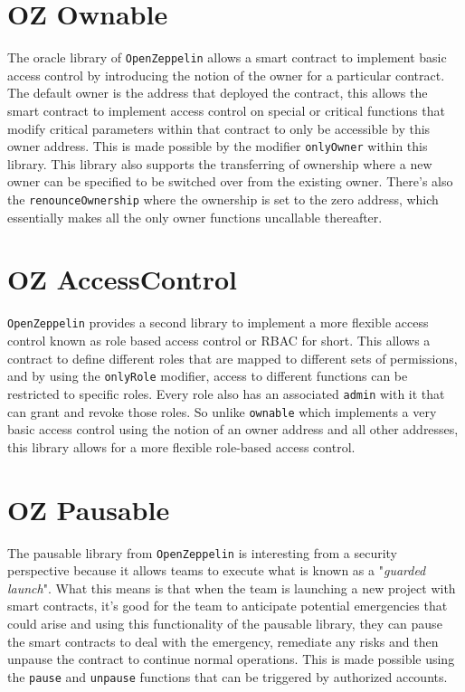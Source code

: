 \section{OZ Ownable}
The oracle library of \verb|OpenZeppelin| allows a smart contract to implement basic access control by introducing the notion of the owner for a particular contract. The default owner is the address that deployed the contract, this allows the smart contract to implement access control on special or critical functions that modify critical parameters within that contract to only be accessible by this owner address. This is made possible by the modifier \verb|onlyOwner| within this library. This library also supports the transferring of ownership where a new owner can be specified to be switched over from the existing owner. There's also the \verb|renounceOwnership| where the ownership is set to the zero address, which essentially makes all the only owner functions uncallable thereafter.

\section{OZ AccessControl}
\verb|OpenZeppelin| provides a second library to implement a more flexible access control known as role based access control or RBAC for short. This allows a contract to define different roles that are mapped to different sets of permissions, and by using the \verb|onlyRole| modifier, access to different functions can be restricted to specific roles. Every role also has an associated \verb|admin| with it that can grant and revoke those roles. So unlike \verb|ownable| which implements a very basic access control using the notion of an owner address and all other addresses, this library allows for a more flexible role-based access control.

\section{OZ Pausable}
The pausable library from \verb|OpenZeppelin| is interesting from a security perspective because it allows teams to execute what is known as a "\textit{guarded launch}". What this means is that when the team is launching a new project with smart contracts, it's good for the team to anticipate potential emergencies that could arise and using this functionality of the pausable library, they can pause the smart contracts to deal with the emergency, remediate any risks and then unpause the contract to continue normal operations. This is made possible using the \verb|pause| and \verb|unpause| functions that can be triggered by authorized accounts.\\


